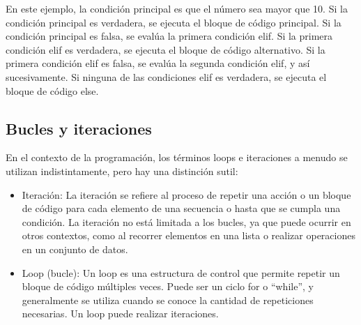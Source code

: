 En este ejemplo, la condición principal es que el número sea mayor que 10. Si la condición principal es verdadera, se ejecuta el bloque de código principal. Si la condición principal es falsa, se evalúa la primera condición elif. Si la primera condición elif es verdadera, se ejecuta el bloque de código alternativo. Si la primera condición elif es falsa, se evalúa la segunda condición elif, y así sucesivamente. Si ninguna de las condiciones elif es verdadera, se ejecuta el bloque de código else.

\subsection{Bucles y iteraciones}
En el contexto de la programación, los términos loops e iteraciones a menudo se utilizan indistintamente, pero hay una distinción sutil:

\begin{itemize}
    \item Iteración: La iteración se refiere al proceso de repetir una acción o un bloque de código para cada elemento de una secuencia o hasta que se cumpla una condición. La iteración no está limitada a los bucles, ya que puede ocurrir en otros contextos, como al recorrer elementos en una lista o realizar operaciones en un conjunto de datos.
    \item Loop (bucle): Un loop es una estructura de control que permite repetir un bloque de código múltiples veces. Puede ser un ciclo for o ``while'', y generalmente se utiliza cuando se conoce la cantidad de repeticiones necesarias. Un loop puede realizar iteraciones.
\end{itemize}

